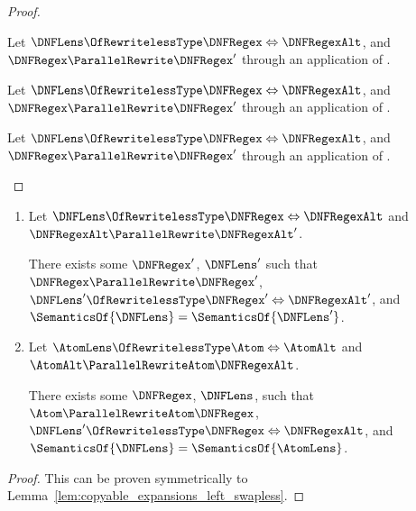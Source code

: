 \documentclass[sigplan,acmsmall]{acmart}
\begin{document}
\begin{proof}
  
  \begin{case}[\DNFReorderRule{}]
    Let $\DNFLens \OfRewritelessType \DNFRegex \Leftrightarrow \DNFRegexAlt$, and
    $\DNFRegex\ParallelRewrite\DNFRegex'$ through an application of
    \DNFReorderRule{}.
  \end{case}

  \begin{case}[\ParallelDNFStructuralRewriteRule{}]
    Let $\DNFLens \OfRewritelessType \DNFRegex \Leftrightarrow \DNFRegexAlt$, and
    $\DNFRegex\ParallelRewrite\DNFRegex'$ through an application of
    \ParallelDNFStructuralRewriteRule{}.
  \end{case}

  \begin{case}[\IdentityRewriteRule{}]
    Let $\DNFLens \OfRewritelessType \DNFRegex \Leftrightarrow \DNFRegexAlt$, and
    $\DNFRegex\ParallelRewrite\DNFRegex'$ through an application of
    \IdentityRewriteRule{}.
  \end{case}
\end{proof}

\begin{lemma}
  \label{lem:copyable_expansions_right_swapless}\leavevmode
  \begin{enumerate}
  \item Let $\DNFLens \OfRewritelessType \DNFRegex \Leftrightarrow
    \DNFRegexAlt$ and $\DNFRegexAlt \ParallelRewrite \DNFRegexAlt'$.

    There exists some
    $\DNFRegex'$, $\DNFLens'$ such that $\DNFRegex \ParallelRewrite
    \DNFRegex'$,
    $\DNFLens' \OfRewritelessType
    \DNFRegex' \Leftrightarrow \DNFRegexAlt'$, and $\SemanticsOf{\DNFLens} =
    \SemanticsOf{\DNFLens'}$.
  \item Let $\AtomLens \OfRewritelessType \Atom \Leftrightarrow \AtomAlt$ and
    $\AtomAlt \ParallelRewriteAtom \DNFRegexAlt$.

    There exists some $\DNFRegex$,
    $\DNFLens$, such that $\Atom \ParallelRewriteAtom \DNFRegex$,
    $\DNFLens' \OfRewritelessType \DNFRegex
    \Leftrightarrow \DNFRegexAlt$, and $\SemanticsOf{\DNFLens} =
    \SemanticsOf{\AtomLens}$.
  \end{enumerate}
\end{lemma}
\begin{proof}
  This can be proven symmetrically to Lemma~\ref{lem:copyable_expansions_left_swapless}.
\end{proof}
\end{document}
